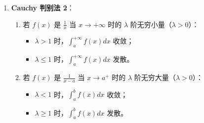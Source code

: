 \documentclass[UTF8]{ctexart}
\theoremstyle{remark}
\begin{document}
\begin{enumerate}
	\item \textbf{Cauchy 判别法 2}：
	\begin{enumerate}
		\item 若 \(f(x)\) 是 \(\frac{1}{x}\) 当 \(x \to +\infty\) 时的 \(\lambda\) 阶无穷小量（\(\lambda > 0\)）：
		\begin{itemize}
			\item \(\lambda > 1\) 时，\(\int_{a}^{+\infty} f(x) dx\) 收敛；
			\item \(\lambda \leqslant 1\) 时，\(\int_{a}^{+\infty} f(x) dx\) 发散。
		\end{itemize}
		\item 若 \(f(x)\) 是 \(\frac{1}{x-a}\) 当 \(x \to a^+\) 时的 \(\lambda\) 阶无穷大量（\(\lambda > 0\)）：
		\begin{itemize}
			\item \(\lambda < 1\) 时，\(\int_{a}^{b} f(x) dx\) 收敛；
			\item \(\lambda \geqslant 1\) 时，\(\int_{a}^{b} f(x) dx\) 发散。
		\end{itemize}
	\end{enumerate}
	

\end{enumerate}
\end{document}
